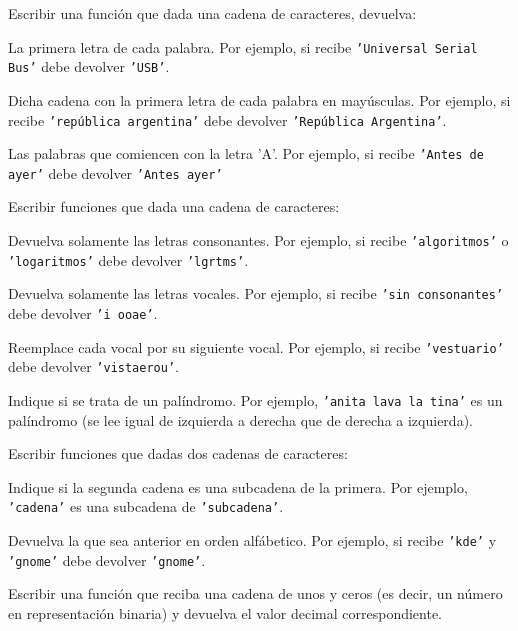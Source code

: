 \begin{ejercicio}
Escribir una función que dada una cadena de caracteres, devuelva:
\begin{partes}
\item La primera letra de cada palabra. Por ejemplo, si recibe
\texttt{'Universal Serial Bus'} debe devolver \texttt{'USB'}.
\item Dicha cadena con la primera letra de cada palabra en mayúsculas. Por
ejemplo, si recibe \texttt{'república argentina'} debe devolver
\texttt{'República Argentina'}.
\item Las palabras que comiencen con la letra 'A'. Por ejemplo, si recibe
\texttt{'Antes de ayer'} debe devolver \texttt{'Antes ayer'}
\end{partes}
\end{ejercicio}


\begin{ejercicio}
Escribir funciones que dada una cadena de caracteres:
\begin{partes}
\item Devuelva solamente las letras consonantes. Por ejemplo, si recibe
\texttt{'algoritmos'} o \texttt{'logaritmos'} debe devolver \texttt{'lgrtms'}.
\item Devuelva solamente las letras vocales. Por ejemplo, si recibe \texttt{'sin
consonantes'} debe devolver \texttt{'i ooae'}.
\item Reemplace cada vocal por su siguiente vocal. Por ejemplo, si recibe
\texttt{'vestuario'} debe devolver \texttt{'vistaerou'}.
\item Indique si se trata de un palíndromo. Por ejemplo, \texttt{'anita
lava la tina'} es un palíndromo (se lee igual de izquierda a derecha que de
derecha a izquierda).
\end{partes}
\end{ejercicio}


\begin{ejercicio}
Escribir funciones que dadas dos cadenas de caracteres:
\begin{partes}
\item Indique si la segunda cadena es una subcadena de la primera. Por ejemplo,
\texttt{'cadena'} es una subcadena de \texttt{'subcadena'}.
\item Devuelva la que sea anterior en orden alfábetico. Por ejemplo, si recibe
\texttt{'kde'} y \texttt{'gnome'} debe devolver \texttt{'gnome'}.
\end{partes}
\end{ejercicio}


\begin{ejercicio}
Escribir una función que reciba una cadena de unos y ceros (es decir, un
número en representación binaria) y devuelva el valor decimal
correspondiente.
\end{ejercicio}

